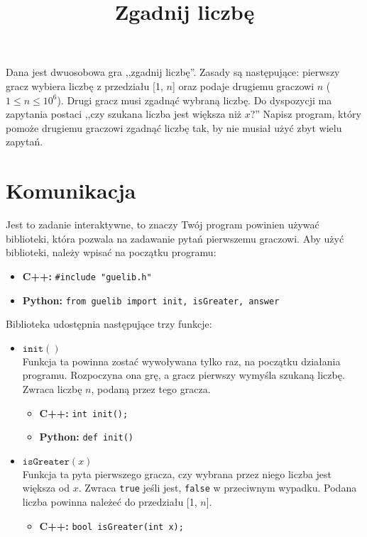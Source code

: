 \documentclass[zad,zawodnik,utf8]{sinol}
\title{Zgadnij liczbę}
\begin{document}
\begin{tasktext}

    \noindent Dana jest dwuosobowa gra ,,zgadnij liczbę''. Zasady są następujące:
    pierwszy gracz wybiera liczbę z przedziału [1, $n$]
    oraz podaje drugiemu graczowi $n$ ($1 \leq n \leq 10^6$).
    Drugi gracz musi zgadnąć wybraną liczbę. 
    Do dyspozycji ma zapytania postaci ,,czy szukana liczba jest większa niż $x$?''
    Napisz program, który pomoże drugiemu graczowi zgadnąć liczbę tak,
    by nie musiał użyć zbyt wielu zapytań.

\section{Komunikacja}
    Jest to zadanie interaktywne,
    to znaczy Twój program powinien używać biblioteki,
    która pozwala na zadawanie pytań pierwszemu graczowi.
    Aby użyć biblioteki, należy wpisać na początku programu:
    \begin{itemize}
        \item \textbf{C++:}
            \verb|#include "guelib.h"|

        \item \textbf{Python:}
            \texttt{from guelib import init, isGreater, answer}
    \end{itemize}
    Biblioteka udostępnia następujące trzy funkcje:
    \begin{itemize}
        \item $\texttt{init}()$ \\
            Funkcja ta powinna zostać wywoływana
            tylko raz, na początku działania programu.
            Rozpoczyna ona grę, a gracz pierwszy wymyśla szukaną liczbę.
            Zwraca liczbę $n$, podaną przez tego gracza.
            \begin{itemize}
                \item \textbf{C++:}
		                \texttt{int init();}

                \item \textbf{Python:}
		                \texttt{def init()}
            \end{itemize}

        \item $\texttt{isGreater}(x)$ \\
            Funkcja ta pyta pierwszego gracza,
            czy wybrana przez niego liczba jest większa od $x$.
            Zwraca \texttt{true} jeśli jest, \texttt{false} w przeciwnym wypadku.
            Podana liczba powinna należeć do przedziału [1, $n$].
            \begin{itemize}
                \item \textbf{C++:}
		                \texttt{bool isGreater(int x);}


\end{itemize}
\end{itemize}
\end{tasktext}
\end{document}
